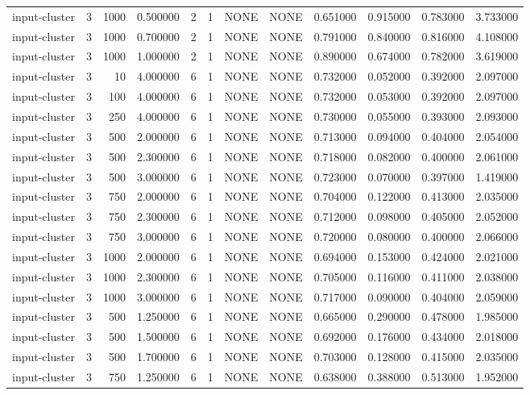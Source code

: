 \begin{tabular}{lrrrllllrrrr}
input-cluster & 3 & 1000 & 0.500000 & 2 & 1 & NONE & NONE & 0.651000 & 0.915000 & 0.783000 & 3.733000 \\
input-cluster & 3 & 1000 & 0.700000 & 2 & 1 & NONE & NONE & 0.791000 & 0.840000 & 0.816000 & 4.108000 \\
input-cluster & 3 & 1000 & 1.000000 & 2 & 1 & NONE & NONE & 0.890000 & 0.674000 & 0.782000 & 3.619000 \\
input-cluster & 3 & 10 & 4.000000 & 6 & 1 & NONE & NONE & 0.732000 & 0.052000 & 0.392000 & 2.097000 \\
input-cluster & 3 & 100 & 4.000000 & 6 & 1 & NONE & NONE & 0.732000 & 0.053000 & 0.392000 & 2.097000 \\
input-cluster & 3 & 250 & 4.000000 & 6 & 1 & NONE & NONE & 0.730000 & 0.055000 & 0.393000 & 2.093000 \\
input-cluster & 3 & 500 & 2.000000 & 6 & 1 & NONE & NONE & 0.713000 & 0.094000 & 0.404000 & 2.054000 \\
input-cluster & 3 & 500 & 2.300000 & 6 & 1 & NONE & NONE & 0.718000 & 0.082000 & 0.400000 & 2.061000 \\
input-cluster & 3 & 500 & 3.000000 & 6 & 1 & NONE & NONE & 0.723000 & 0.070000 & 0.397000 & 1.419000 \\
input-cluster & 3 & 750 & 2.000000 & 6 & 1 & NONE & NONE & 0.704000 & 0.122000 & 0.413000 & 2.035000 \\
input-cluster & 3 & 750 & 2.300000 & 6 & 1 & NONE & NONE & 0.712000 & 0.098000 & 0.405000 & 2.052000 \\
input-cluster & 3 & 750 & 3.000000 & 6 & 1 & NONE & NONE & 0.720000 & 0.080000 & 0.400000 & 2.066000 \\
input-cluster & 3 & 1000 & 2.000000 & 6 & 1 & NONE & NONE & 0.694000 & 0.153000 & 0.424000 & 2.021000 \\
input-cluster & 3 & 1000 & 2.300000 & 6 & 1 & NONE & NONE & 0.705000 & 0.116000 & 0.411000 & 2.038000 \\
input-cluster & 3 & 1000 & 3.000000 & 6 & 1 & NONE & NONE & 0.717000 & 0.090000 & 0.404000 & 2.059000 \\
input-cluster & 3 & 500 & 1.250000 & 6 & 1 & NONE & NONE & 0.665000 & 0.290000 & 0.478000 & 1.985000 \\
input-cluster & 3 & 500 & 1.500000 & 6 & 1 & NONE & NONE & 0.692000 & 0.176000 & 0.434000 & 2.018000 \\
input-cluster & 3 & 500 & 1.700000 & 6 & 1 & NONE & NONE & 0.703000 & 0.128000 & 0.415000 & 2.035000 \\
input-cluster & 3 & 750 & 1.250000 & 6 & 1 & NONE & NONE & 0.638000 & 0.388000 & 0.513000 & 1.952000 \\

\end{tabular}

